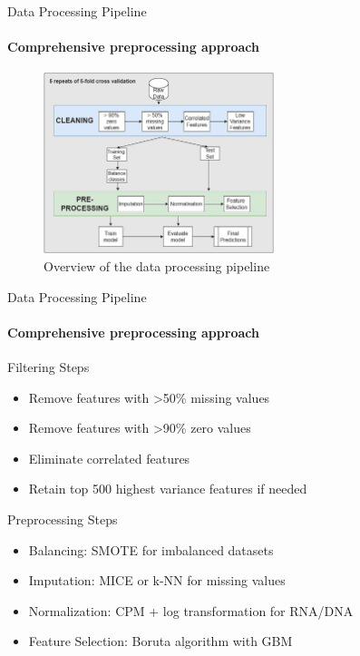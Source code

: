 \documentclass{beamer}
\begin{document}
\begin{frame}{Data Processing Pipeline}
\framesubtitle{Comprehensive preprocessing approach}

\begin{figure}[H]
  \centering
  \includegraphics[width=0.6\textwidth]{assets/data_processing_pipeline.png}
  \caption{Overview of the data processing pipeline}
\end{figure}

\end{frame}


\begin{frame}{Data Processing Pipeline}
\framesubtitle{Comprehensive preprocessing approach}
\begin{block}{Filtering Steps}
\begin{itemize}
\item Remove features with >50\% missing values
\item Remove features with >90\% zero values
\item Eliminate correlated features
\item Retain top 500 highest variance features if needed
\end{itemize}
\end{block}

\begin{block}{Preprocessing Steps}
\begin{itemize}
\item \alert{Balancing}: SMOTE for imbalanced datasets
\item \alert{Imputation}: MICE or k-NN for missing values
\item \alert{Normalization}: CPM + log transformation for RNA/DNA
\item \alert{Feature Selection}: Boruta algorithm with GBM
\end{itemize}
\end{block}
\end{frame}
\end{document}
